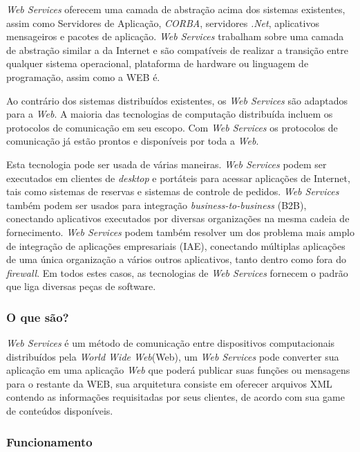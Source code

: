 \documentclass{acm_proc_article-sp}
\begin{document}
		\emph{Web Services} oferecem uma camada de abstração acima dos sistemas existentes, assim como Servidores de Aplicação, \emph{CORBA}, servidores \emph{.Net}, aplicativos mensageiros e pacotes de aplicação. \emph{Web Services} trabalham sobre 
		uma camada de abstração similar a da Internet e são compatíveis de realizar a transição entre qualquer sistema operacional, plataforma de hardware ou linguagem de programação, assim como a WEB é.
		
		Ao contrário dos sistemas distribuídos existentes, os \emph{Web Services} são adaptados para a \emph{Web}. A maioria das tecnologias de computação distribuída incluem os protocolos de comunicação em seu escopo. Com \emph{Web Services} os protocolos de comunicação já estão prontos e disponíveis por toda a \emph{Web}. 
		
		Esta tecnologia pode ser usada de várias maneiras. \emph{Web Services} podem ser executados em clientes de \emph{desktop} e portáteis para acessar aplicações de Internet, tais como sistemas de reservas e sistemas de controle de pedidos. \emph{Web Services} também podem ser usados para integração \emph{business-to-business} (B2B), conectando aplicativos executados por diversas organizações na mesma cadeia de fornecimento. \emph{Web Services} podem também resolver um dos problema mais amplo de integração de aplicações empresariais (IAE), conectando múltiplas aplicações de uma única organização a vários outros aplicativos, tanto dentro como fora do \emph{firewall}. Em todos estes casos, as tecnologias de \emph{Web Services} fornecem o padrão que liga diversas peças de software.\cite{UNDERWEBSERVICES}
		
		\subsubsection{O que são?}
		
			\emph{Web Services} é um método de comunicação entre dispositivos computacionais distribuídos pela \emph{World Wide Web}(Web), um \emph{Web Services} pode converter sua aplicação em uma aplicação \emph{Web} que poderá publicar suas funções ou mensagens para o restante da WEB, sua arquitetura consiste em oferecer arquivos XML contendo as informações requisitadas por seus clientes, de acordo com sua game de conteúdos disponíveis.\cite{WEBS}
		
		\subsubsection{Funcionamento}
		
\end{document}
